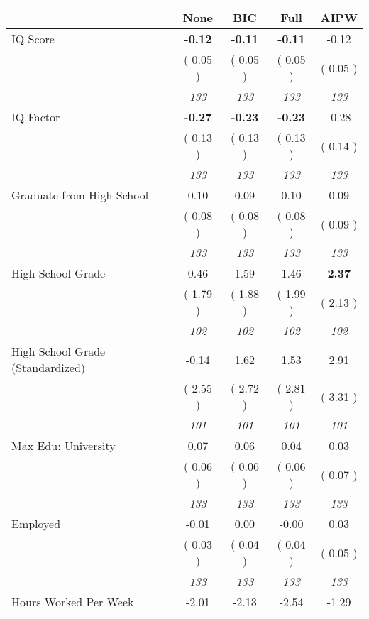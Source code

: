 \begin{tabular}{l c c c c}
\toprule
 & None & BIC & Full & AIPW \\
\midrule
IQ Score & \textbf{     -0.12 } & \textbf{     -0.11 } & \textbf{     -0.11 } &     -0.12 \\
& (     0.05 ) & (     0.05 ) & (     0.05 ) & (     0.05 ) \\
& \textit{ 133 } & \textit{ 133 } & \textit{ 133 } & \textit{ 133 } \\
IQ Factor & \textbf{     -0.27 } & \textbf{     -0.23 } & \textbf{     -0.23 } &     -0.28 \\
& (     0.13 ) & (     0.13 ) & (     0.13 ) & (     0.14 ) \\
& \textit{ 133 } & \textit{ 133 } & \textit{ 133 } & \textit{ 133 } \\
Graduate from High School &      0.10 &      0.09 &      0.10 &      0.09 \\
& (     0.08 ) & (     0.08 ) & (     0.08 ) & (     0.09 ) \\
& \textit{ 133 } & \textit{ 133 } & \textit{ 133 } & \textit{ 133 } \\
High School Grade &      0.46 &      1.59 &      1.46 & \textbf{     2.37} \\
& (     1.79 ) & (     1.88 ) & (     1.99 ) & (     2.13 ) \\
& \textit{ 102 } & \textit{ 102 } & \textit{ 102 } & \textit{ 102 } \\
High School Grade (Standardized) &     -0.14 &      1.62 &      1.53 &      2.91 \\
& (     2.55 ) & (     2.72 ) & (     2.81 ) & (     3.31 ) \\
& \textit{ 101 } & \textit{ 101 } & \textit{ 101 } & \textit{ 101 } \\
Max Edu: University &      0.07 &      0.06 &      0.04 &      0.03 \\
& (     0.06 ) & (     0.06 ) & (     0.06 ) & (     0.07 ) \\
& \textit{ 133 } & \textit{ 133 } & \textit{ 133 } & \textit{ 133 } \\
Employed &     -0.01 &      0.00 &     -0.00 &      0.03 \\
& (     0.03 ) & (     0.04 ) & (     0.04 ) & (     0.05 ) \\
& \textit{ 133 } & \textit{ 133 } & \textit{ 133 } & \textit{ 133 } \\
Hours Worked Per Week &     -2.01 &     -2.13 &     -2.54 &     -1.29 \\

\end{tabular}
